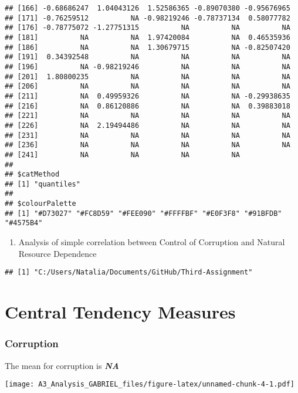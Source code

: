 \documentclass[]{article}
\begin{document}
\begin{verbatim}
## [166] -0.68686247  1.04043126  1.52586365 -0.89070380 -0.95676965
## [171] -0.76259512          NA -0.98219246 -0.78737134  0.58077782
## [176] -0.78775072 -1.27751315          NA          NA          NA
## [181]          NA          NA  1.97420084          NA  0.46535936
## [186]          NA          NA  1.30679715          NA -0.82507420
## [191]  0.34392548          NA          NA          NA          NA
## [196]          NA -0.98219246          NA          NA          NA
## [201]  1.80800235          NA          NA          NA          NA
## [206]          NA          NA          NA          NA          NA
## [211]          NA  0.49959326          NA          NA -0.29938635
## [216]          NA  0.86120886          NA          NA  0.39883018
## [221]          NA          NA          NA          NA          NA
## [226]          NA  2.19494486          NA          NA          NA
## [231]          NA          NA          NA          NA          NA
## [236]          NA          NA          NA          NA          NA
## [241]          NA          NA          NA          NA
## 
## $catMethod
## [1] "quantiles"
## 
## $colourPalette
## [1] "#D73027" "#FC8D59" "#FEE090" "#FFFFBF" "#E0F3F8" "#91BFDB" "#4575B4"
\end{verbatim}

\begin{enumerate}
\def\labelenumi{\arabic{enumi}.}
\itemsep1pt\parskip0pt
\item
  Analysis of simple correlation between Control of Corruption and
  Natural Resource Dependence
\end{enumerate}

\begin{verbatim}
## [1] "C:/Users/Natalia/Documents/GitHub/Third-Assignment"
\end{verbatim}

\section{Central Tendency Measures}\label{central-tendency-measures}

\subsubsection{Corruption}\label{corruption}

The mean for corruption is \textbf{\emph{NA}}

\texttt{[image: A3\_Analysis\_GABRIEL\_files/figure-latex/unnamed-chunk-4-1.pdf]}
\end{document}

